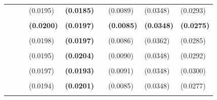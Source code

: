 \documentclass[
  12pt,
]{article}
\begin{document}
\begin{table}[H]
{\begin{tabular}[t]{llll>{}lllll}
 &  &  & (0.0195) & \textbf{(0.0185)} &  & (0.0089) & (0.0348) & (0.0293)\\
\addlinespace
\textbf{\cellcolor{gray!6}{BIS Basel gap}} & \textbf{\cellcolor{gray!6}{-113.9826}} & \textbf{\cellcolor{gray!6}{-120.0507}} & \textbf{\cellcolor{gray!6}{0.7124}} & \textbf{\textbf{\cellcolor{gray!6}{0.6390}}} & \textbf{\cellcolor{gray!6}{3.9706}} & \textbf{\cellcolor{gray!6}{0.3847}} & \textbf{\cellcolor{gray!6}{0.3011}} & \textbf{\cellcolor{gray!6}{0.2387}}\\
\textbf{} & \textbf{} & \textbf{} & \textbf{(0.0200)} & \textbf{\textbf{(0.0197)}} & \textbf{} & \textbf{(0.0085)} & \textbf{(0.0348)} & \textbf{(0.0275)}\\
\addlinespace
\cellcolor{gray!6}{c.hp221k} & \cellcolor{gray!6}{-104.1190} & \cellcolor{gray!6}{-110.1871} & \cellcolor{gray!6}{0.7070} & \textbf{\cellcolor{gray!6}{0.6388}} & \cellcolor{gray!6}{3.8869} & \cellcolor{gray!6}{0.3755} & \cellcolor{gray!6}{0.3011} & \cellcolor{gray!6}{0.2317}\\
 &  &  & (0.0198) & \textbf{(0.0197)} &  & (0.0086) & (0.0362) & (0.0285)\\
\addlinespace
\cellcolor{gray!6}{c.stm.r15} & \cellcolor{gray!6}{-86.6063} & \cellcolor{gray!6}{-92.6744} & \cellcolor{gray!6}{0.6989} & \textbf{\cellcolor{gray!6}{0.6382}} & \cellcolor{gray!6}{4.0784} & \cellcolor{gray!6}{0.3486} & \cellcolor{gray!6}{0.3295} & \cellcolor{gray!6}{0.2301}\\
 &  &  & (0.0195) & \textbf{(0.0204)} &  & (0.0090) & (0.0348) & (0.0292)\\
\addlinespace
\cellcolor{gray!6}{c.stm} & \cellcolor{gray!6}{-89.9073} & \cellcolor{gray!6}{-95.9754} & \cellcolor{gray!6}{0.6929} & \textbf{\cellcolor{gray!6}{0.6357}} & \cellcolor{gray!6}{3.3071} & \cellcolor{gray!6}{0.3924} & \cellcolor{gray!6}{0.3295} & \cellcolor{gray!6}{0.2626}\\
 &  &  & (0.0197) & \textbf{(0.0193)} &  & (0.0091) & (0.0348) & (0.0300)\\
\addlinespace
\cellcolor{gray!6}{c.hp400k.r15} & \cellcolor{gray!6}{-73.5902} & \cellcolor{gray!6}{-79.6582} & \cellcolor{gray!6}{0.6869} & \textbf{\cellcolor{gray!6}{0.6357}} & \cellcolor{gray!6}{4.2355} & \cellcolor{gray!6}{0.3496} & \cellcolor{gray!6}{0.3125} & \cellcolor{gray!6}{0.2199}\\
 &  &  & (0.0194) & \textbf{(0.0201)} &  & (0.0085) & (0.0348) & (0.0277)\\
\addlinespace
\cellcolor{gray!6}{c.linear} & \cellcolor{gray!6}{-111.9570} & \cellcolor{gray!6}{-118.0251} & \cellcolor{gray!6}{0.7069} & \textbf{\cellcolor{gray!6}{0.6356}} & \cellcolor{gray!6}{3.9964} & \cellcolor{gray!6}{0.4620} & \cellcolor{gray!6}{0.2443} & \cellcolor{gray!6}{0.2732}\\

\end{tabular}}
\end{table}
\end{document}
